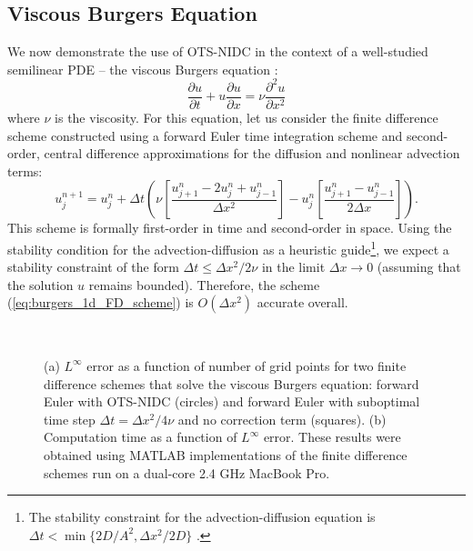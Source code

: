 \documentclass[fleqn,12pt,twoside]{article}
\newcommand{\beq}{\begin{equation}}
\newcommand{\eeq}{\end{equation}}
\def\pt{\partial t}
\def\px{\partial x}
\def\dt{\Delta t}
\def\dx{\Delta x}
\begin{document}
\subsection{Viscous Burgers Equation}
We now demonstrate the use of OTS-NIDC in the context of a well-studied
semilinear PDE -- the viscous Burgers equation \cite{whitham_book}:
\beq
  \frac{\partial u}{\pt} + u \frac{\partial u}{\px} = 
     \nu \frac{\partial^2 u}{\px^2} 
  \label{eq:burgers_1d}
\eeq
where $\nu$ is the viscosity.  For this equation, let us consider the finite
difference scheme constructed using a forward Euler time integration scheme
and second-order, central difference approximations for the diffusion and 
nonlinear advection terms:
\beq
  u^{n+1}_j = u^{n}_j 
  + \dt 
    \left( \nu 
      \left [ \frac{u^{n}_{j+1} -2 u^{n}_j + u^{n}_{j-1}}{\dx^2} \right]
         - u^n_j 
      \left[ \frac{u^{n}_{j+1} - u^{n}_{j-1}}{2 \dx} \right] 
    \right).
  \label{eq:burgers_1d_FD_scheme}
\eeq
This scheme is formally first-order in time and second-order in space.  
Using the stability condition for the advection-diffusion as a heuristic 
guide\footnote{The stability constraint for the advection-diffusion equation
is $\dt < \min \{2D/A^2, \dx^2/2D \}$ \cite{chan_1984}.}, 
we expect a stability constraint of the form $\dt \le \dx^2/2 \nu$ in the 
limit $\dx \rightarrow 0$ (assuming that the solution $u$ remains bounded).  
Therefore, the scheme (\ref{eq:burgers_1d_FD_scheme}) is $O(\dx^2)$ accurate 
overall. 

\begin{figure}[tb]
\begin{center}
\ \ \ \ \ \ \ 
\caption{(a) $L^\infty$ error as a function of number of grid points for
two finite difference schemes that solve the viscous Burgers equation:
forward Euler with OTS-NIDC (circles)
and forward Euler with suboptimal time step $\dt = \dx^2/4\nu$ and no 
correction term (squares).
(b) Computation time as a function of $L^\infty$ error.  These results were
obtained using MATLAB implementations of the finite difference schemes run on
a dual-core 2.4 GHz MacBook Pro.
}
\end{center}
\end{figure}
\end{document}
